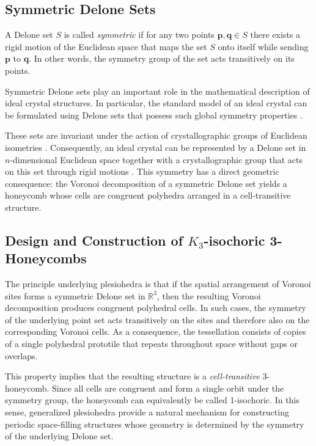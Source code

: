 \documentclass[times,twocolumn,final]{elsarticle}
\begin{document}
\subsection{Symmetric Delone Sets}\label{sec:SDS}

A Delone set $S$ is called \textit{symmetric} if for any two points $\mathbf{p},\mathbf{q} \in S$ there exists a rigid motion of the Euclidean space that maps the set $S$ onto itself while sending $\mathbf{p}$ to $\mathbf{q}$. In other words, the symmetry group of the set acts transitively on its points.

Symmetric Delone sets play an important role in the mathematical description of ideal crystal structures. In particular, the standard model of an ideal crystal can be formulated using Delone sets that possess such global symmetry properties \cite{dolbilin2015delone,dolbilin2021regularity}. 

These sets are invariant under the action of crystallographic groups of Euclidean isometries \cite{dolbilin2015delone}. Consequently, an ideal crystal can be represented by a Delone set in $n$-dimensional Euclidean space together with a crystallographic group that acts on this set through rigid motions \cite{delaunay1961}. 
This symmetry has a direct geometric consequence: the Voronoi decomposition of a symmetric Delone set yields a honeycomb whose cells are congruent polyhedra arranged in a cell-transitive structure.

\subsection{Design and Construction of $K_3$-isochoric 3-Honeycombs}

The principle underlying plesiohedra is that if the spatial arrangement of Voronoi sites forms a symmetric Delone set in $\mathbb{R}^3$, then the resulting Voronoi decomposition produces congruent polyhedral cells. In such cases, the symmetry of the underlying point set acts transitively on the sites and therefore also on the corresponding Voronoi cells. As a consequence, the tessellation consists of copies of a single polyhedral prototile that repeats throughout space without gaps or overlaps. 

This property implies that the resulting structure is a \textit{cell-transitive} 3-honeycomb. Since all cells are congruent and form a single orbit under the symmetry group, the honeycomb can equivalently be called 1-isochoric.
In this sense, generalized plesiohedra provide a natural mechanism for constructing periodic space-filling structures whose geometry is determined by the symmetry of the underlying Delone set. 
\end{document}
